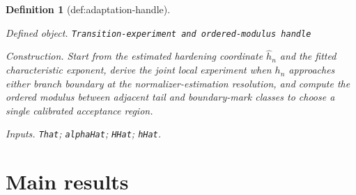 \documentclass{article}
\newtheorem{definition}{Definition}
\begin{document}
\begin{definition}[def:adaptation-handle]\label{def:adaptation-handle}
\par\smallskip\noindent\emph{Defined object.} \texttt{Transition-\allowbreak{}experiment and ordered-\allowbreak{}modulus handle}
\par\smallskip\noindent\emph{Construction.} Start from the estimated hardening coordinate \(\widehat h_n\) and the fitted characteristic exponent, derive the joint local experiment when \(h_n\) approaches either branch boundary at the normalizer-estimation resolution, and compute the ordered modulus between adjacent tail and boundary-mark classes to choose a single calibrated acceptance region.
\par\smallskip\noindent\emph{Inputs.} \texttt{That}; \texttt{alphaHat}; \texttt{HHat}; \texttt{hHat}.
\end{definition}

\section{Main results}
\end{document}
